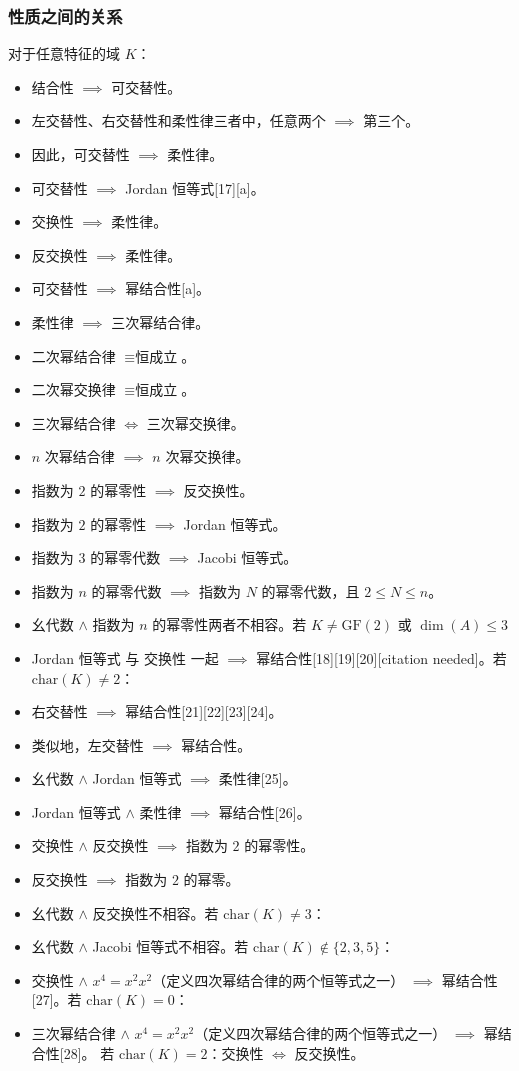 \subsubsection{性质之间的关系}
对于任意特征的域 $K$：

\begin{itemize}
\item 结合性 $\implies$ 可交替性。
\item 左交替性、右交替性和柔性律三者中，任意两个 $\implies$ 第三个。
\item 因此，可交替性 $\implies$ 柔性律。
\item 可交替性 $\implies$ Jordan 恒等式[17][a]。
\item 交换性 $\implies$ 柔性律。
\item 反交换性 $\implies$ 柔性律。
\item 可交替性 $\implies$ 幂结合性[a]。
\item 柔性律 $\implies$ 三次幂结合律。
\item 二次幂结合律 $\equiv \text{恒成立}$。
\item 二次幂交换律 $\equiv \text{恒成立}$。
\item 三次幂结合律 $\iff$ 三次幂交换律。
\item $n$ 次幂结合律 $\implies$ $n$ 次幂交换律。
\item 指数为 $2$ 的幂零性 $\implies$ 反交换性。
\item 指数为 $2$ 的幂零性 $\implies$ Jordan 恒等式。
\item 指数为 $3$ 的幂零代数 $\implies$ Jacobi 恒等式。
\item 指数为 $n$ 的幂零代数 $\implies$ 指数为 $N$ 的幂零代数，且 $2 \leq N \leq n$。
\item 幺代数 $\wedge$ 指数为 $n$ 的幂零性两者不相容。若 $K \neq \mathrm{GF}(2)$ 或 $\dim(A) \leq 3$
\item Jordan 恒等式 与 交换性 一起 $\implies$ 幂结合性[18][19][20][citation needed]。若 $\mathrm{char}(K) \neq 2$：
\item 右交替性 $\implies$ 幂结合性[21][22][23][24]。
\item 类似地，左交替性 $\implies$ 幂结合性。
\item 幺代数 $\wedge$ Jordan 恒等式 $\implies$ 柔性律[25]。
\item Jordan 恒等式 $\wedge$ 柔性律 $\implies$ 幂结合性[26]。
\item 交换性 $\wedge$ 反交换性 $\implies$ 指数为 $2$ 的幂零性。
\item 反交换性 $\implies$ 指数为 $2$ 的幂零。
\item 幺代数 $\wedge$ 反交换性不相容。若 $\mathrm{char}(K) \neq 3$：
\item 幺代数 $\wedge$ Jacobi 恒等式不相容。若 $\mathrm{char}(K) \notin \{2,3,5\}$：
\item 交换性 $\wedge$ $x^4 = x^2x^2$（定义四次幂结合律的两个恒等式之一） $\implies$ 幂结合性[27]。若 $\mathrm{char}(K) = 0$：
\item 三次幂结合律 $\wedge$ $x^4 = x^2x^2$（定义四次幂结合律的两个恒等式之一） $\implies$ 幂结合性[28]。
若 $\mathrm{char}(K) = 2$：交换性 $\iff$ 反交换性。
\end{itemize}
